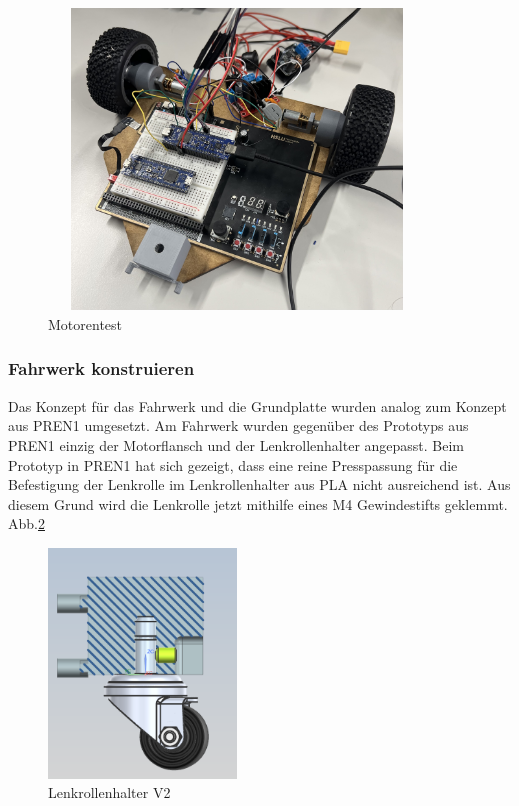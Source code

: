 \begin{figure}[H]
\centering
\includegraphics[width=10cm, height=8cm]{assets/ET/Motoren/Motorentest.jpeg}
\caption{Motorentest}
\label{fig: Motorentest}
\end{figure}

\subsubsection{Fahrwerk konstruieren}

 Das Konzept für das Fahrwerk und die Grundplatte wurden analog zum Konzept aus PREN1 umgesetzt. Am Fahrwerk wurden gegenüber des Prototyps aus PREN1 einzig der Motorflansch und der Lenkrollenhalter angepasst. Beim Prototyp in PREN1 hat sich gezeigt, dass eine reine Presspassung für die Befestigung der Lenkrolle im Lenkrollenhalter aus PLA nicht ausreichend ist. Aus diesem Grund wird die Lenkrolle jetzt mithilfe eines M4 Gewindestifts geklemmt. Abb.\ref{fig: Lenkrollenhalter V2} 

\begin{figure}[H]
\centering
\includegraphics[width=5cm]{assets/MT/Lenkrollenhalter V2.png}
\caption{Lenkrollenhalter V2}
\label{fig: Lenkrollenhalter V2}
\end{figure}


